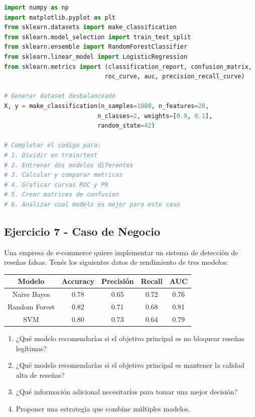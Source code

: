 \documentclass[12pt]{article}
\begin{document}
\begin{lstlisting}[language=Python]
import numpy as np
import matplotlib.pyplot as plt
from sklearn.datasets import make_classification
from sklearn.model_selection import train_test_split
from sklearn.ensemble import RandomForestClassifier
from sklearn.linear_model import LogisticRegression
from sklearn.metrics import (classification_report, confusion_matrix, 
                            roc_curve, auc, precision_recall_curve)

# Generar dataset desbalanceado
X, y = make_classification(n_samples=1000, n_features=20, 
                          n_classes=2, weights=[0.9, 0.1], 
                          random_state=42)

# Completar el codigo para:
# 1. Dividir en train/test
# 2. Entrenar dos modelos diferentes
# 3. Calcular y comparar metricas
# 4. Graficar curvas ROC y PR
# 5. Crear matrices de confusion
# 6. Analizar cual modelo es mejor para este caso
\end{lstlisting}

\subsection{Ejercicio 7 - Caso de Negocio}

Una empresa de e-commerce quiere implementar un sistema de detección de reseñas falsas. Tenés los siguientes datos de rendimiento de tres modelos:

\begin{table}[H]
    \centering
    \begin{tabular}{|c|c|c|c|c|}
        \hline
        \textbf{Modelo} & \textbf{Accuracy} & \textbf{Precisión} & \textbf{Recall} & \textbf{AUC} \\
        \hline
        Naive Bayes & 0.78 & 0.65 & 0.72 & 0.76 \\
        \hline
        Random Forest & 0.82 & 0.71 & 0.68 & 0.81 \\
        \hline
        SVM & 0.80 & 0.73 & 0.64 & 0.79 \\
        \hline
    \end{tabular}
\end{table}

\begin{enumerate}
    \item[a.] ¿Qué modelo recomendarías si el objetivo principal es no bloquear reseñas legítimas?
    \item[b.] ¿Qué modelo recomendarías si el objetivo principal es mantener la calidad alta de reseñas?
    \item[c.] ¿Qué información adicional necesitarías para tomar una mejor decisión?
    \item[d.] Proponer una estrategia que combine múltiples modelos.
\end{enumerate}
\end{document}
